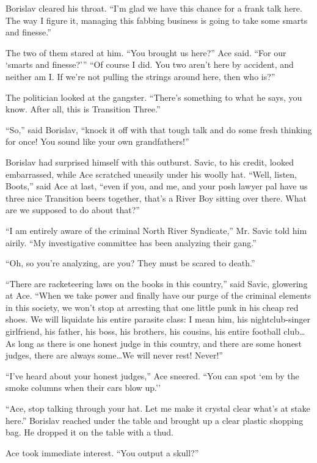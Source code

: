 \documentclass[20 pt,twoside,extrafontsizes,final]{memoir}
\begin{document}
Borislav cleared his throat. ``I'm glad we have this chance for a frank talk here. The way I figure it, managing this fabbing business is going to take some smarts and finesse.''

The two of them stared at him. ``You brought us here?'' Ace said. ``For our `smarts and finesse?'''
``Of course I did. You two aren't here by accident, and neither am I. If we're not pulling the strings around here, then who is?''

The politician looked at the gangster. ``There's something to what he says, you know. After all, this is Transition Three.''

``So,'' said Borislav, ``knock it off with that tough talk and do some fresh thinking for once! You sound like your own grandfathers!''

Borislav had surprised himself with this outburst. Savic, to his credit, looked embarrassed, while Ace scratched uneasily under his woolly hat. ``Well, listen, Boots,'' said Ace at last, ``even if you, and me, and your posh lawyer pal have us three nice Transition beers together, that's a River Boy sitting over there. What are we supposed to do about that?''

``I am entirely aware of the criminal North River Syndicate,'' Mr. Savic told him airily. ``My investigative committee has been analyzing their gang.''

``Oh, so you're analyzing, are you? They must be scared to death.''

``There are racketeering laws on the books in this country,'' said Savic, glowering at Ace. ``When we take power and finally have our purge of the criminal elements in this society, we won't stop at arresting that one little punk in his cheap red shoes. We will liquidate his entire parasite class: I mean him, his nightclub-singer girlfriend, his father, his boss, his brothers, his cousins, his entire football club\dots As long as there is one honest judge in this country, and there are some honest judges, there are always some\dots We will never rest! Never!''

``I've heard about your honest judges,'' Ace sneered. ``You can spot `em by the smoke columns when their cars blow up.''

``Ace, stop talking through your hat. Let me make it crystal clear what's at stake here.'' Borislav reached under the table and brought up a clear plastic shopping bag. He dropped it on the table with a thud.

Ace took immediate interest. ``You output a skull?''
\end{document}
